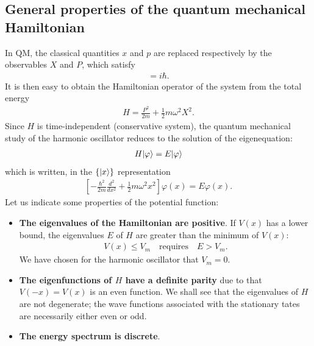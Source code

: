 \subsection{General properties of the quantum mechanical Hamiltonian}
In QM, the classical quantities $x$ and $p$ are replaced respectively by the observables $X$ and $P$, which satisfy 
\begin{align*}
    [X,P]=i\hbar.
\end{align*}
It is then easy to obtain the Hamiltonian operator of the system from the total energy
\begin{align*}
    H=\frac{P^2}{2m}+\frac{1}{2}m\omega^2X^2.
\end{align*}
Since $H$ is time-independent (conservative system), the quantum mechanical study of the harmonic oscillator reduces to the solution of the eigenequation:
\begin{align*}
    H|\varphi\rangle=E|\varphi\rangle
\end{align*}
which is written, in the $\{|x\rangle\}$ representation 
\begin{align*}
    \left[-\frac{\hbar^2}{2m}\frac{d^2}{dx^2}+\frac{1}{2}m\omega^2x^2\right]\varphi(x)=E\varphi(x).
\end{align*}
Let us indicate some properties of the potential function:
\begin{itemize}[itemsep=0pt,topsep=0pt]
    \item\textbf{The eigenvalues of the Hamiltonian are positive}. If $V(x)$ has a lower bound, the eigenvalues $E$ of $H$ are greater than the minimum of $V(x)$:
    \begin{align*}
        V(x)\leq V_m\quad\text{requires}\quad E>V_m.
    \end{align*}
    We have chosen for the harmonic oscillator that $V_m=0$.
    \item\textbf{The eigenfunctions of $H$ have a definite parity} due to that $V(-x)=V(x)$ is an even function. We shall see that the eigenvalues of $H$ are not degenerate;
    the wave functions associated with the stationary tates are necessarily either even or odd.
    \item\textbf{The energy spectrum is discrete}. 
\end{itemize}
